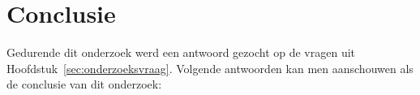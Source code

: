 
\chapter{Conclusie}
\label{ch:conclusie}

Gedurende dit onderzoek werd een antwoord gezocht op de vragen uit Hoofdstuk~\ref{sec:onderzoeksvraag}. Volgende antwoorden kan men aanschouwen als de conclusie van dit onderzoek:  

